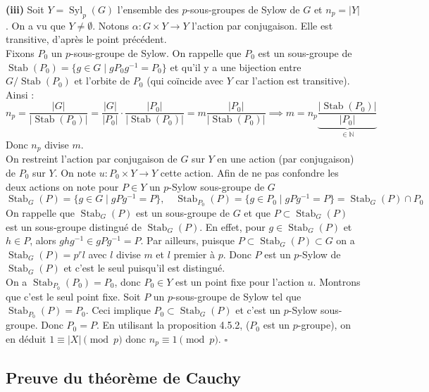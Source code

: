 \documentclass{article}
\begin{document}
{\textbf{(iii)} Soit $Y = \operatorname{Syl}_p(G)$ l'ensemble des $p$-sous-groupes de Sylow de $G$ et $n_p = |Y|$. On a vu que $Y \neq \emptyset$. Notons $\alpha : G \times Y \to Y$ l'action par conjugaison. Elle est transitive, d'après le point précédent.\\
Fixons $P_0$ un $p$-sous-groupe de Sylow. On rappelle que $P_0$ est un sous-groupe de $\operatorname{Stab}(P_0) = \{g \in G \mid gP_0g^{-1} = P_0\}$ et qu'il y a une bijection entre $G/\operatorname{Stab}(P_0)$ et l'orbite de $P_0$ (qui coïncide avec $Y$ car l'action est transitive). Ainsi :
\[
n_p = \frac{|G|}{|\operatorname{Stab}(P_0)|} = \frac{|G|}{|P_0|} \cdot \frac{|P_0|}{|\operatorname{Stab}(P_0)|} = m \frac{|P_0|}{|\operatorname{Stab}(P_0)|} \implies m = n_p \underbrace{\frac{|\operatorname{Stab}(P_0)|}{|P_0|}}_{\in \mathbb{N}}
\]
Donc $n_p$ divise $m$.\\
On restreint l'action par conjugaison de $G$ sur $Y$ en une action (par conjugaison) de $P_0$ sur $Y$. On note $u : P_0 \times Y \to Y$ cette action. Afin de ne pas confondre les deux actions on note pour $P \in Y$ un $p$-Sylow sous-groupe de $G$
\[
\operatorname{Stab}_G(P) = \{g \in G \mid gPg^{-1} = P\}, \quad \operatorname{Stab}_{P_0}(P) = \{g \in P_0 \mid gPg^{-1} = P\} = \operatorname{Stab}_G(P) \cap P_0
\]
On rappelle que $\operatorname{Stab}_G(P)$ est un sous-groupe de $G$ et que $P \subset \operatorname{Stab}_G(P)$ est un sous-groupe distingué de $\operatorname{Stab}_G(P)$. En effet, pour $g \in \operatorname{Stab}_G(P)$ et $h \in P$, alors $ghg^{-1} \in gPg^{-1} = P$. Par ailleurs, puisque $P \subset \operatorname{Stab}_G(P) \subset G$ on a $\operatorname{Stab}_G(P) = p^r l$ avec $l$ divise $m$ et $l$ premier à $p$. Donc $P$ est un $p$-Sylow de $\operatorname{Stab}_G(P)$ et c'est le seul puisqu'il est distingué.\\
On a $\operatorname{Stab}_{P_0}(P_0) = P_0$, donc $P_0 \in Y$ est un point fixe pour l'action $u$. Montrons que c'est le seul point fixe. Soit $P$ un $p$-sous-groupe de Sylow tel que $\operatorname{Stab}_{P_0}(P) = P_0$. Ceci implique $P_0 \subset \operatorname{Stab}_G(P)$ et c'est un $p$-Sylow sous-groupe. Donc $P_0 = P$. En utilisant la proposition 4.5.2, ($P_0$ est un $p$-groupe), on en déduit $1 \equiv |X| \pmod p$ donc $n_p \equiv 1 \pmod p$. \hfill $\square$
}

\subsection{Preuve du théorème de Cauchy}
\end{document}
